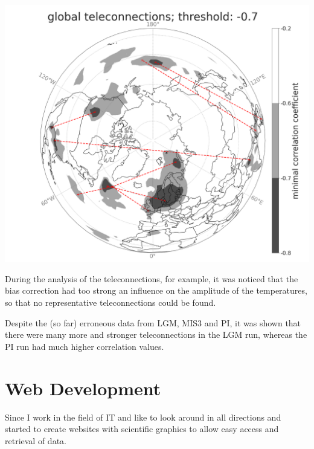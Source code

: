 \documentclass[a0,portrait]{a0poster}
\begin{document}
\begin{multicols}{3}
\begin{center}\vspace{1cm}
\includegraphics[width=1.0\linewidth]{globalteleconn.png}
\end{center}\vspace{1cm}

During the analysis of the teleconnections, for example, it was noticed that the bias correction had too strong an influence on the amplitude of the temperatures, so that no representative teleconnections could be found.

Despite the (so far) erroneous data from LGM, MIS3 and PI, it was shown that there were many more and stronger teleconnections in the LGM run, whereas the PI run had much higher correlation values.


\section{Web Development}
Since I work in the field of IT and like to look around in all directions and started to create websites with scientific graphics to allow easy access and retrieval of data.


\end{multicols}
\end{document}
